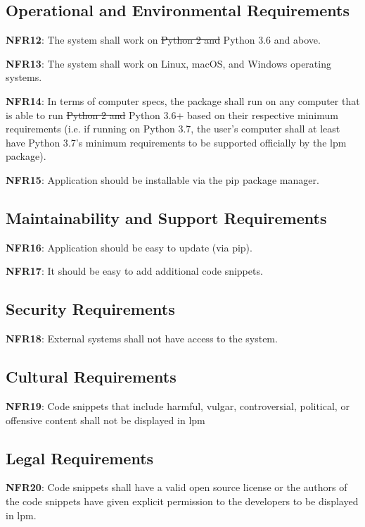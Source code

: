 \documentclass[12pt, titlepage]{article}
\begin{document}
\subsection{Operational and Environmental Requirements}

\noindent \textbf{NFR12}: The system shall work on \sout{Python 2 and} Python 3{\color{red}.6 and above}.

\noindent \textbf{NFR13}: The system shall work on Linux, macOS, and Windows operating systems.

\noindent \textbf{NFR14}: In terms of computer specs, the package shall run on any computer that is able to run \sout{Python 2 and }Python 3{\color{red}.6+} based on their respective minimum requirements (i.e. if running on Python 3{\color{red}.7}, the user's computer shall at least have Python 3{\color{red}.7}'s minimum requirements to be supported officially by the lpm package).

\noindent \textbf{NFR15}: Application should be installable via the pip package manager.

\subsection{Maintainability and Support Requirements}

\noindent \textbf{NFR16}: Application should be easy to update (via pip).

\noindent \textbf{NFR17}: It should be easy to add additional code snippets.

\subsection{Security Requirements}

\noindent \textbf{NFR18}: External systems shall not have access to the system.

\subsection{Cultural Requirements}

\noindent \textbf{NFR19}: Code snippets that include harmful, vulgar, controversial, political, or offensive content shall not be displayed in lpm

\subsection{Legal Requirements}

\noindent \textbf{NFR20}: Code snippets shall have a valid open source license {\color{red}or the authors of the code snippets have given explicit permission to the developers} to be displayed in lpm.
\end{document}
